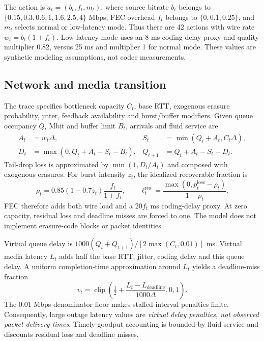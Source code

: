 \documentclass[10pt]{article}
\begin{document}
The action is $a_t=(b_t,f_t,m_t)$, where source bitrate $b_t$ belongs to $\{0.15,0.3,0.6,1,1.6,2.5,4\}$ Mbps, FEC overhead $f_t$ belongs to $\{0,0.1,0.25\}$, and $m_t$ selects normal or low-latency mode. Thus there are 42 actions with wire rate $w_t=b_t(1+f_t)$. Low-latency mode uses an 8 ms coding-delay proxy and quality multiplier 0.82, versus 25 ms and multiplier 1 for normal mode. These values are synthetic modeling assumptions, not codec measurements.

\subsection{Network and media transition}
The trace specifies bottleneck capacity $C_t$, base RTT, exogenous erasure probability, jitter, feedback availability and burst/buffer modifiers. Given queue occupancy $Q_t$ Mbit and buffer limit $B_t$, arrivals and fluid service are
\begin{align}
A_t &= w_t\Delta, & S_t &= \min(Q_t+A_t,C_t\Delta), \\
D_t &= \max(0,Q_t+A_t-S_t-B_t), & Q_{t+1}&=Q_t+A_t-S_t-D_t.
\end{align}
Tail-drop loss is approximated by $\min(1,D_t/A_t)$ and composed with exogenous erasures. For burst intensity $z_t$, the idealized recoverable fraction is
\begin{equation}
\rho_t=0.85(1-0.7z_t)\frac{f_t}{1+f_t},\qquad
\ell_t^{\mathrm{res}}=\frac{\max(0,p_t^{\mathrm{loss}}-\rho_t)}{1-\rho_t}.
\end{equation}
FEC therefore adds both wire load and a $20f_t$ ms coding-delay proxy. At zero capacity, residual loss and deadline misses are forced to one. The model does not implement erasure-code blocks or packet identities.

Virtual queue delay is $1000(Q_t+Q_{t+1})/[2\max(C_t,0.01)]$ ms. Virtual media latency $L_t$ adds half the base RTT, jitter, coding delay and this queue delay. A uniform completion-time approximation around $L_t$ yields a deadline-miss fraction
\begin{equation}
v_t=\operatorname{clip}\left(\tfrac12+\frac{L_t-L_{\mathrm{deadline}}}{1000\Delta},0,1\right).
\end{equation}
The 0.01 Mbps denominator floor makes stalled-interval penalties finite. Consequently, large outage latency values are \emph{virtual delay penalties, not observed packet delivery times}. Timely-goodput accounting is bounded by fluid service and discounts residual loss and deadline misses.
\end{document}
